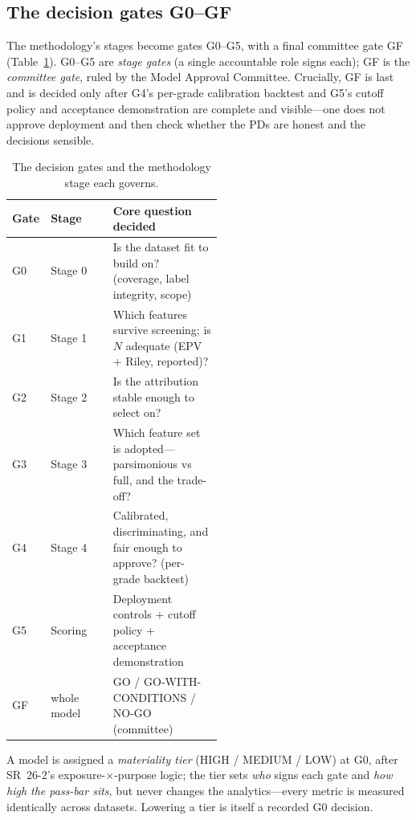 \documentclass[9pt,journal]{IEEEtai}
\begin{document}
\subsection{The decision gates G0--GF}
The methodology's stages become gates G0--G5, with a final committee gate GF (Table~\ref{tab:gates}).
G0--G5 are \emph{stage gates} (a single accountable role signs each); GF is the \emph{committee
gate}, ruled by the Model Approval Committee. Crucially, GF is last and is decided only after
G4's per-grade calibration backtest and G5's cutoff policy and acceptance demonstration are
complete and visible---one does not approve deployment and then check whether the PDs are
honest and the decisions sensible.

\begin{table}[!t]
\centering
\caption{The decision gates and the methodology stage each governs.}
\label{tab:gates}
\footnotesize
\begin{tabular}{@{}llp{0.52\linewidth}@{}}
\toprule
Gate & Stage & Core question decided \\
\midrule
G0 & Stage 0 & Is the dataset fit to build on? (coverage, label integrity, scope) \\
G1 & Stage 1 & Which features survive screening; is $N$ adequate (EPV + Riley, reported)? \\
G2 & Stage 2 & Is the attribution stable enough to select on? \\
G3 & Stage 3 & Which feature set is adopted---parsimonious vs full, and the trade-off? \\
G4 & Stage 4 & Calibrated, discriminating, and fair enough to approve? (per-grade backtest) \\
G5 & Scoring & Deployment controls + cutoff policy + acceptance demonstration \\
GF & whole model & GO / GO-WITH-CONDITIONS / NO-GO (committee) \\
\bottomrule
\end{tabular}
\end{table}

A model is assigned a \emph{materiality tier} (HIGH / MEDIUM / LOW) at G0, after SR~26-2's
exposure-$\times$-purpose logic; the tier sets \emph{who} signs each gate and \emph{how high the
pass-bar sits}, but never changes the analytics---every metric is measured identically across
datasets. Lowering a tier is itself a recorded G0 decision.
\end{document}
